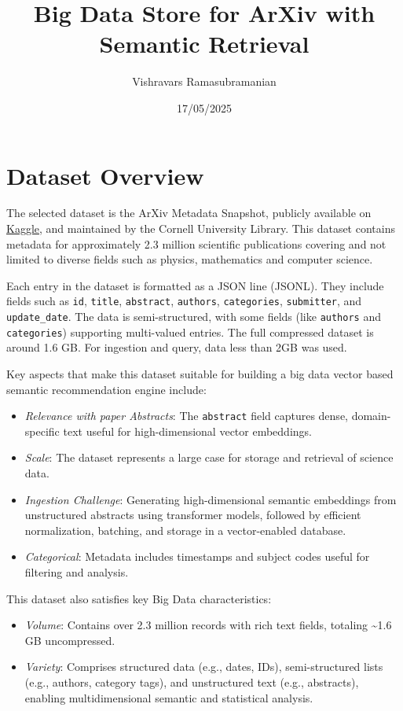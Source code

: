 \documentclass[11pt]{article}
\author{Vishravars Ramasubramanian}
\date{17/05/2025}
\title{Big Data Store for ArXiv with Semantic Retrieval}
\begin{document}
\maketitle
\section{Dataset Overview}
\label{sec:org6ac2baa}
The selected dataset is the ArXiv Metadata Snapshot, publicly available on \href{https://www.kaggle.com/datasets/Cornell-University/arxiv/data}{Kaggle}, and maintained by the Cornell University Library. This dataset contains metadata for approximately 2.3 million scientific publications covering and not limited to diverse fields such as physics, mathematics and computer science.

Each entry in the dataset is formatted as a JSON line (JSONL). They include fields such as \texttt{id}, \texttt{title}, \texttt{abstract}, \texttt{authors}, \texttt{categories}, \texttt{submitter}, and \texttt{update\_date}. The data is semi-structured, with some fields (like \texttt{authors} and \texttt{categories}) supporting multi-valued entries. The full compressed dataset is around 1.6 GB. For ingestion and query, data less than 2GB was used.

Key aspects that make this dataset suitable for building a big data vector based semantic recommendation engine include:

\begin{itemize}
\item \emph{Relevance with paper Abstracts}: The \texttt{abstract} field captures dense, domain-specific text useful for high-dimensional vector embeddings.
\item \emph{Scale}: The dataset represents a large case for storage and retrieval of science data.
\item \emph{Ingestion Challenge}: Generating high-dimensional semantic embeddings from unstructured abstracts using transformer models, followed by efficient normalization, batching, and storage in a vector-enabled database.
\item \emph{Categorical}: Metadata includes timestamps and subject codes useful for filtering and analysis.
\end{itemize}

This dataset also satisfies key Big Data characteristics:
\begin{itemize}
\item \emph{Volume}: Contains over 2.3 million records with rich text fields, totaling \textasciitilde{}1.6 GB uncompressed.
\item \emph{Variety}: Comprises structured data (e.g., dates, IDs), semi-structured lists (e.g., authors, category tags), and unstructured text (e.g., abstracts), enabling multidimensional semantic and statistical analysis.
\end{itemize}
\end{document}
